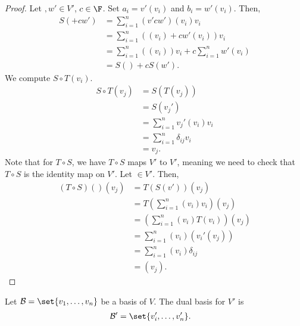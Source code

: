 \documentclass[10pt]{mypackage}
\begin{document}
\begin{proof}
  Let $,w'\in V'$, $c\in \F$. Set $a_i = v'\left(v_i\right)$ and $b_i = w'\left(v_i\right)$. Then,
  \begin{align*}
    S\left( + cw'\right) &= \sum_{i=1}^{n}\left(v' cw'\right)\left(v_i\right)v_i\\
                           &= \sum_{i=1}^{n}\left(\left(v_i\right) + cw'\left(v_i\right)\right)v_i\\
                           &= \sum_{i=1}^{n}\left(\left(v_i\right)\right)v_i + c\sum_{i=1}^{n}w'\left(v_i\right)\\
                           &= S\left(\right) + cS\left(w'\right).
  \end{align*}
  We compute $S\circ T\left(v_i\right)$.
  \begin{align*}
    S\circ T\left(v_j\right) &= S\left(T\left(v_j\right)\right)\\
                             &= S\left(v_j'\right)\\
                             &= \sum_{i=1}^{n}v_j'\left(v_i\right)v_i\\
                             &= \sum_{i=1}^{n}\delta_{ij}v_i\\
                             &= v_j.
  \end{align*}
  Note that for $T\circ S$, we have $T\circ S$ maps $V'$ to $V'$, meaning we need to check that $T\circ S$ is the identity map on $V'$. Let $\in V'$. Then,
  \begin{align*}
    \left(T\circ S\right)\left(\right)\left(v_j\right) &= T\left(S\left(v'\right)\right)\left(v_j\right)\\
                                                         &= T\left(\sum_{i=1}^{n}\left(v_i\right)v_i\right)\left(v_j\right)\\
                                                         &= \left(\sum_{i=1}^{n}\left(v_i\right)T\left(v_i\right)\right)\left(v_j\right)\\
                                                         &= \sum_{i=1}^{n}\left(v_i\right)\left(v_i'\left(v_j\right)\right)\\
                                                         &= \sum_{i=1}^{n}\left(v_i\right)\delta_{ij}\\
                                                         &= \left(v_j\right).
  \end{align*}
\end{proof}
\begin{definition}
  Let $\mathcal{B} = \set{v_1,\dots,v_n}$ be a basis of $V$. The dual basis for $V'$ is
  \begin{align*}
    \mathcal{B}' &= \set{v_i',\dots,v_n'}.
  \end{align*}
\end{definition}
\end{document}
